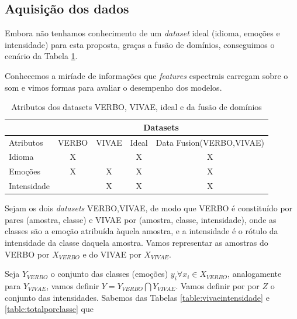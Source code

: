 \subsection{Aquisição dos dados}

Embora não tenhamos conhecimento de um \textit{dataset} ideal (idioma, emoções e intensidade) para esta proposta, graças a fusão de domínios, conseguimos o cenário da Tabela \ref{table:datasetideal}.

Conhecemos a miríade de informações que \textit{features} espectrais carregam sobre o som e vimos formas para avaliar o desempenho dos modelos.

\begin{table}[!h]
\centering
\label{table:datasetideal}
\caption{Atributos dos datasets VERBO, VIVAE, ideal e da fusão de domínios}
\begin{tabular}{l|cccc|}
\cline{2-5}
 & \multicolumn{4}{c|}{Datasets} \\ \hline
\multicolumn{1}{|l|}{Atributos} & \multicolumn{1}{c|}{VERBO} & \multicolumn{1}{c|}{VIVAE} & \multicolumn{1}{c|}{Ideal} & Data Fusion(VERBO,VIVAE) \\ \hline
\multicolumn{1}{|l|}{Idioma} & \multicolumn{1}{c|}{X} & \multicolumn{1}{c|}{} & \multicolumn{1}{c|}{X} & X \\ \hline
\multicolumn{1}{|l|}{Emoções} & \multicolumn{1}{c|}{X} & \multicolumn{1}{c|}{X} & \multicolumn{1}{c|}{X} & X \\ \hline
\multicolumn{1}{|l|}{Intensidade} & \multicolumn{1}{c|}{} & \multicolumn{1}{c|}{X} & \multicolumn{1}{c|}{X} & X \\ \hline
\end{tabular}
\end{table}

Sejam os dois \textit{datasets} VERBO,VIVAE, de modo que VERBO é constituído por pares (amostra, classe) e VIVAE por (amostra, classe, intensidade), onde as classes são a emoção atribuída àquela amostra, e a intensidade é o rótulo da intensidade da classe daquela amostra. Vamos representar as amostras do VERBO por $X_{VERBO}$ e do VIVAE por $X_{VIVAE}$.

Seja $Y_{VERBO}$ o conjunto das classes (emoções) $y_i \forall x_i \in X_{VERBO}$, analogamente para $Y_{VIVAE}$, vamos definir $Y = Y_{VERBO} \bigcap Y_{VIVAE}$. Vamos definir por por $Z$ o conjunto das intensidades. Sabemos das Tabelas \ref{table:vivaeintensidade} e \ref{table:totalporclasse} que

